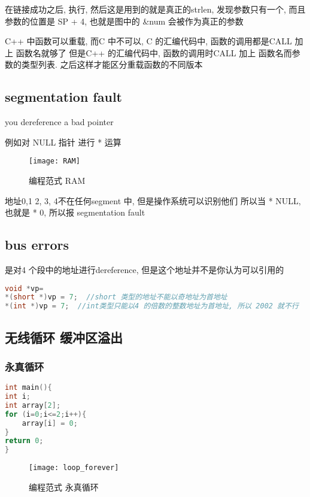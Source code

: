 \documentclass{article}
\begin{document}
在链接成功之后, 执行, 然后这是用到的就是真正的strlen, 发现参数只有一个, 而且参数的位置是
SP + 4, 也就是图中的 \&num 会被作为真正的参数

C++ 中函数可以重载, 而C 中不可以,
C 的汇编代码中, 函数的调用都是CALL 加上 函数名就够了
但是C++ 的汇编代码中, 函数的调用时CALL 加上 函数名而参数的类型列表. 之后这样才能区分重载函数的不同版本

\subsection{segmentation fault}
you dereference a bad pointer

例如对 NULL 指针 进行 * 运算
\begin{figure}[htbp]
	\centering
	\texttt{[image: RAM]}\\
	\caption{编程范式 RAM}\label{fig.RAM}
\end{figure}

地址0,1 2, 3, 4不在任何segment 中, 但是操作系统可以识别他们
所以当 * NULL, 也就是 * 0, 所以报 segmentation fault

\subsection{bus errors}
是对4 个段中的地址进行dereference, 但是这个地址并不是你认为可以引用的
\begin{lstlisting}[language = C]
void *vp=
*(short *)vp = 7;  //short 类型的地址不能以奇地址为首地址
*(int *)vp = 7;  //int类型只能以4 的倍数的整数地址为首地址, 所以 2002 就不行
\end{lstlisting}

\subsection{无线循环 缓冲区溢出}
\subsubsection{永真循环}
\begin{lstlisting}[language = C]
int main(){
int i;
int array[2];
for (i=0;i<=2;i++){
	array[i] = 0;
}
return 0;
}
\end{lstlisting}
\begin{figure}[htbp]
	\centering
	\texttt{[image: loop\_forever]}\\
	\caption{编程范式 永真循环}\label{fig.loop_forever}
\end{figure}
\end{document}
